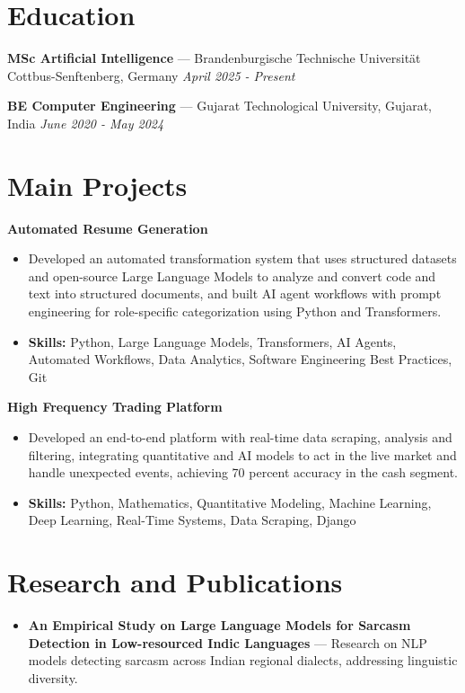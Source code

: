 \documentclass[a4paper,10pt]{article}
\begin{document}
\section*{Education}
\textbf{MSc Artificial Intelligence} — Brandenburgische Technische Universität Cottbus-Senftenberg, Germany \hfill \textit{April 2025 - Present}\par
\vspace{1.5pt}
\textbf{BE Computer Engineering} — Gujarat Technological University, Gujarat, India \hfill \textit{June 2020 - May 2024}\par

\section*{Main Projects}
\textbf{Automated Resume Generation}\par
\vspace{1pt}
\begin{itemize}
  \item Developed an automated transformation system that uses structured datasets and open-source Large Language Models to analyze and convert code and text into structured documents, and built AI agent workflows with prompt engineering for role-specific categorization using Python and Transformers.
  \item \textbf{Skills:} Python, Large Language Models, Transformers, AI Agents, Automated Workflows, Data Analytics, Software Engineering Best Practices, Git
\end{itemize}
\vspace{3pt}
\textbf{High Frequency Trading Platform}\par
\vspace{1pt}
\begin{itemize}
  \item Developed an end-to-end platform with real-time data scraping, analysis and filtering, integrating quantitative and AI models to act in the live market and handle unexpected events, achieving 70 percent accuracy in the cash segment.
  \item \textbf{Skills:} Python, Mathematics, Quantitative Modeling, Machine Learning, Deep Learning, Real-Time Systems, Data Scraping, Django
\end{itemize}

\section*{Research and Publications}
\begin{itemize}
\item \textbf{An Empirical Study on Large Language Models for Sarcasm Detection in Low-resourced Indic Languages} — Research on NLP models detecting sarcasm across Indian regional dialects, addressing linguistic diversity.
\end{itemize}
\end{document}
